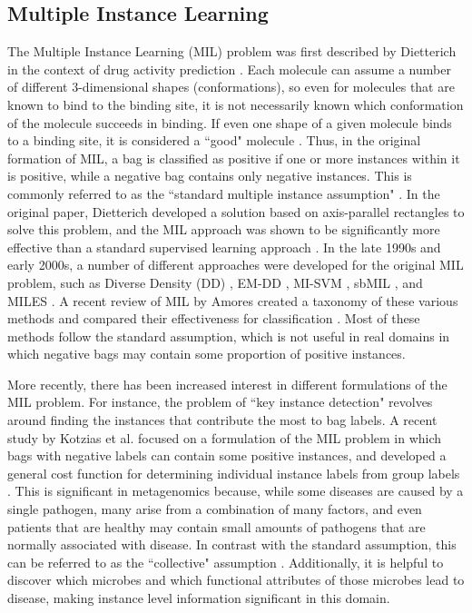 
\subsection{Multiple Instance Learning}

The Multiple Instance Learning (MIL) problem was first described by Dietterich in the context of drug activity prediction \cite{dietterich97}. 
Each molecule can assume a number of different 3-dimensional shapes (conformations), so even for molecules that are known to bind to the binding site, it is not necessarily known which conformation of the molecule succeeds in binding. If even one shape of a given molecule binds to a binding site, it is considered a ``good" molecule \cite{dietterich97}. Thus, in the original formation of MIL, a bag is classified as positive if one or more instances within it is positive, while a negative bag contains only negative instances. This is commonly referred to as the ``standard multiple instance assumption" \cite{amores13}. In the original paper, Dietterich developed a solution based on axis-parallel rectangles to solve this problem, and the MIL approach was shown to be significantly more effective than a standard supervised learning approach \cite{dietterich97}. In the late 1990s and early 2000s, a number of different approaches were developed for the original MIL problem, such as Diverse Density (DD) \cite{perez98}, EM-DD \cite{zhang01}, MI-SVM \cite{andrews02}, sbMIL \cite{bunescu07}, and MILES \cite{wang06}. A recent review of MIL by Amores created a taxonomy of these various methods and compared their effectiveness for classification \cite{amores13}. Most of these methods follow the standard assumption, which is not useful in real domains in which negative bags may contain some proportion of positive instances.
%

More recently, there has been increased interest in different formulations of the MIL problem. For instance, the problem of ``key instance detection" \cite{zhou12} revolves around finding the instances that contribute the most to bag labels. A recent study by Kotzias et al. focused on a formulation of the MIL problem in which bags with negative labels can contain some positive instances, and developed a general cost function for determining individual instance labels from group labels \cite{kotzias15}. This is significant in metagenomics because, while some diseases are caused by a single pathogen, many arise from a combination of many factors, and even patients that are healthy may contain small amounts of pathogens that are normally associated with disease. In contrast with the standard assumption, this can be referred to as the ``collective" assumption \cite{amores13}. Additionally, it is helpful to discover which microbes and which functional attributes of those microbes lead to disease, making instance level information significant in this domain.
%

